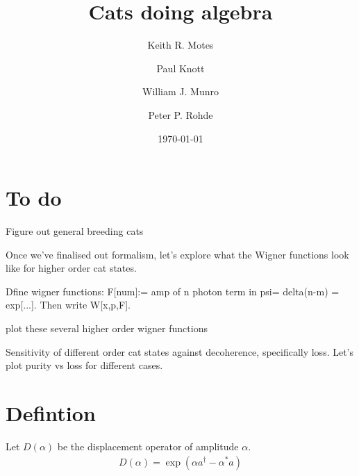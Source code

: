 \documentclass[aps,prl,twocolumn,amsmath,amssymb,nofootinbib,superscriptaddress]{revtex4}
\begin{document}


\title{Cats doing algebra}

\author{Keith R. Motes}

\author{Paul Knott}

\author{William J. Munro}

\author{Peter P. Rohde}

\date{\today}

\frenchspacing

\begin{abstract}
\end{abstract}

\maketitle

\section{To do}

Figure out general breeding cats

Once we've finalised out formalism, let's explore what the Wigner functions look like for higher order cat states.

Dfine wigner functions: F[num]:= amp of n photon term in psi= delta(n-m) = exp[...]. Then write W[x,p,F].

plot these several higher order wigner functions

Sensitivity of different order cat states against decoherence, specifically loss. Let's plot purity vs loss for different cases.

\section{Defintion}

Let $D(\alpha)$ be the displacement operator of amplitude $\alpha$.
\begin{eqnarray}
D(\alpha) = \exp(\alpha a^\dag - \alpha^* a)
\end{eqnarray}
\end{document}

